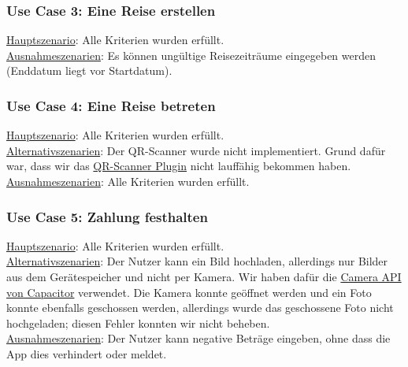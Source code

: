 \subsubsection*{Use Case 3: Eine Reise erstellen}

\begin{addmargin}{10pt}
\underline{Hauptszenario}: Alle Kriterien wurden erfüllt.\\
\underline{Ausnahmeszenarien}: Es können ungültige Reisezeiträume eingegeben werden (Enddatum liegt vor Startdatum).\\
\end{addmargin}

\subsubsection*{Use Case 4: Eine Reise betreten}

\begin{addmargin}{10pt}
\underline{Hauptszenario}: Alle Kriterien wurden erfüllt.\\
\underline{Alternativszenarien}: Der QR-Scanner wurde nicht implementiert. 
Grund dafür war, dass wir das \href{https://ionicframework.com/docs/v3/native/qr-scanner/}{QR-Scanner Plugin} nicht lauffähig bekommen haben.\\
\underline{Ausnahmeszenarien}: Alle Kriterien wurden erfüllt.\\
\end{addmargin}

\subsubsection*{Use Case 5: Zahlung festhalten}

\begin{addmargin}{10pt}
\underline{Hauptszenario}: Alle Kriterien wurden erfüllt.\\
\underline{Alternativszenarien}: Der Nutzer kann ein Bild hochladen, 
allerdings nur Bilder aus dem Gerätespeicher und nicht per Kamera. 
Wir haben dafür die \href{https://ionicframework.com/docs/angular/your-first-app/taking-photos}{Camera API von Capacitor} verwendet. 
Die Kamera konnte geöffnet werden und ein Foto konnte ebenfalls geschossen werden, allerdings wurde das geschossene Foto nicht hochgeladen; 
diesen Fehler konnten wir nicht beheben.\\
\underline{Ausnahmeszenarien}: Der Nutzer kann negative Beträge eingeben, 
ohne dass die App dies verhindert oder meldet.
\end{addmargin}

